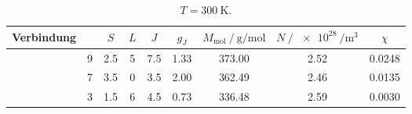 \begin{table}
	\centering
	\caption{$T = \qty{300}{\kelvin}$.}
	\label{tab:zahlen}
	\begin{tabular}{c |
			S[table-format=1.0]
			S[table-format=1.1]
			S[table-format=1.0]
			S[table-format=1.1]
			S[table-format=1.2]
			S[table-format=3.2]
			S[table-format=1.2]
			S[table-format=1.4]}
		\toprule
		Verbindung &  & $S$ & $L$ & $J$ & $g_J$ &
		{$M_\text{mol} \mathbin{/} \unit{\gram\per\mole}$} &
		{$N \mathbin{/} \qty{e28}{\per\cubic\meter}$} & $\chi$ \\
		\midrule
		 & 9 & 2.5 & 5 & 7.5 & 1.33 & 373.00 & 2.52 & 0.0248 \\
		 & 7 & 3.5 & 0 & 3.5 & 2.00 & 362.49 & 2.46 & 0.0135 \\
		 & 3 & 1.5 & 6 & 4.5 & 0.73 & 336.48 & 2.59 & 0.0030 \\
		\bottomrule
	\end{tabular}
\end{table}
